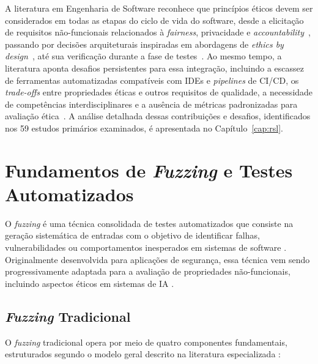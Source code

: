 A literatura em Engenharia de Software reconhece que princípios éticos devem ser considerados em todas as etapas do ciclo de vida do software, desde a elicitação de requisitos não-funcionais relacionados à \textit{fairness}, privacidade e \textit{accountability}~\cite{Aydemir2018}, passando por decisões arquiteturais inspiradas em abordagens de \textit{ethics by design}~\cite{Cavoukian2009, Wynsberghe2013}, até sua verificação durante a fase de testes~\cite{Galhotra2017, Zhang2022}. Ao mesmo tempo, a literatura aponta desafios persistentes para essa integração, incluindo a escassez de ferramentas automatizadas compatíveis com IDEs e \textit{pipelines} de CI/CD, os \textit{trade-offs} entre propriedades éticas e outros requisitos de qualidade, a necessidade de competências interdisciplinares e a ausência de métricas padronizadas para avaliação ética~\cite{McNamara2018, Morley2020}. A análise detalhada dessas contribuições e desafios, identificados nos 59 estudos primários examinados, é apresentada no Capítulo~\ref{cap:rsl}.

\section{Fundamentos de \textit{Fuzzing} e Testes Automatizados}
\label{sec:fuzzing}

O \textit{fuzzing} é uma técnica consolidada de testes automatizados que consiste na geração sistemática de entradas com o objetivo de identificar falhas, vulnerabilidades ou comportamentos inesperados em sistemas de software \cite{Sutton2007,Godefroid2008}. Originalmente desenvolvida para aplicações de segurança, essa técnica vem sendo progressivamente adaptada para a avaliação de propriedades não-funcionais, incluindo aspectos éticos em sistemas de IA \cite{Reddy2025,Salimian2025}.

\subsection{\textit{Fuzzing} Tradicional}
\label{sec:fuzzing-tradicional}

O \textit{fuzzing} tradicional opera por meio de quatro componentes fundamentais, estruturados segundo o modelo geral descrito na literatura especializada \cite{Sutton2007,Manes2021}:

